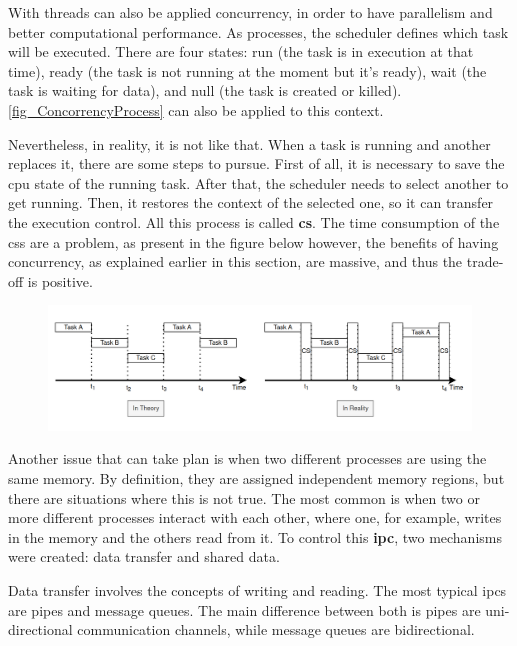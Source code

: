 With threads can also be applied concurrency, in order to have parallelism and better computational performance. As processes, the scheduler 
defines which task will be executed. There are four states: run (the task is in execution at that time), ready (the task is not running at the 
moment but it’s ready), wait (the task is waiting for data), and null (the task is created or killed). \autoref{fig_ConcorrencyProcess} can also 
be applied to this context.

Nevertheless, in reality, it is not like that. When a task is running and another replaces it, there are some steps to pursue. First of all, it 
is necessary to save the \gls{cpu} state of the running task. After that, the scheduler needs to select another to get running. Then, it restores 
the context of the selected one, so it can transfer the execution control. All this process is called \textbf{\gls{cs}}. The time consumption of 
the \glspl{cs} are a problem, as present in the figure below however, the benefits of having concurrency, as explained earlier in this section, 
are massive, and thus the trade-off is positive.

\begin{figure}[H]
	\centering
 	\includegraphics[width=1\linewidth]{Images/ContextSwitch.png}
 	\caption{  }
	 \label{fig_ContextSwitch}
\end{figure}

Another issue that can take plan is when two different processes are using the same memory. By definition, they are assigned independent 
memory regions, but there are situations where this is not true. The most common is when two or more different processes interact with each other, 
where one, for example, writes in the memory and the others read from it. To control this \textbf{\gls{ipc}}, two mechanisms were created: data 
transfer and shared data.

Data transfer involves the concepts of writing and reading. The most typical \glspl{ipc} are pipes and message queues. The main difference 
between both is pipes are uni-directional communication channels, while message queues are bidirectional.

